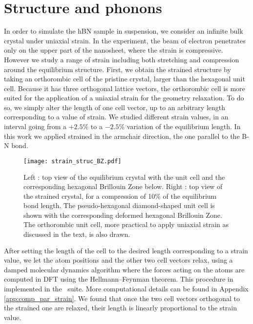 \section{Structure and phonons}
In order to simulate the \acrshort{hBN} sample in suspension, we consider an infinite bulk crystal under uniaxial strain. In the experiment, the beam of electron penetrates only on the upper part of the nanosheet, where the strain is compressive. However we study a range of strain including both stretching and compression around the equilibrium structure.
First, we obtain the strained structure by taking an orthorombic cell of the pristine crystal, larger than the hexagonal unit cell. Because it has three orthogonal lattice vectors, the orthorombic cell is more suited for the application of a uniaxial strain for the geometry relaxation. To do so, we simply alter the length of one cell vector, up to an arbitrary length corresponding to a value of strain. We studied different strain values, in an interval going from a $+2.5\%$ to a $-2.5\%$ variation of the equilibrium length. In this work we applied strained in the armchair direction, the one parallel to the B-N bond. 
\begin{figure}[tbp]
	\vspace{0.5cm}
	\setcapindent{2em}
	\centering
	\texttt{[image: strain\_struc\_BZ.pdf]}
	\caption{Left : top view of the equilibrium crystal with the unit cell and the corresponding hexagonal Brillouin Zone below. 
	Right : top view of the strained crystal, for a compression of 10\% of the equilibrium bond length. The pseudo-hexagonal diamond-shaped unit cell is shown with the corresponding deformed hexagonal Brillouin Zone.
	The orthorombic unit cell, more practical to apply uniaxial strain as discussed in the text, is also drawn.}
	\label{fig:strain_BZ}
\end{figure}
After setting the length of the cell to the desired length corresponding to a strain value, we let the atom positions and the other two cell vectors relax, using a damped molecular dynamics algorithm where the forces acting on the atoms are computed in \acrshort{DFT} using the Hellmann--Feynman theorem. This procedure in implemented in the \qe ~suite.\cite{giannozzi2009quantum,giannozzi2017advanced} More computational details can be found in Appendix \ref{app:comp_par_strain}. We found that once the two cell vectors orthogonal to the strained one are relaxed, their length is linearly proportional to the strain value.


